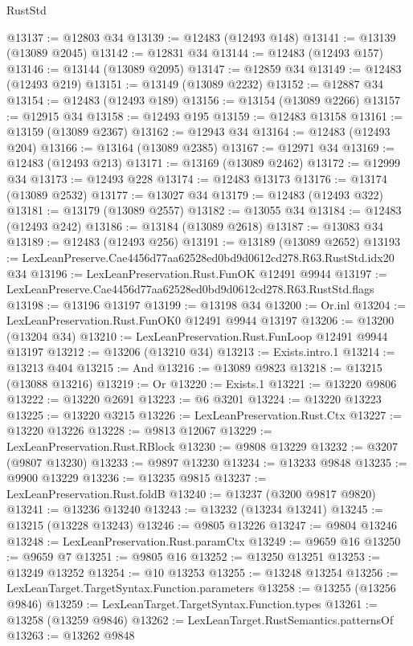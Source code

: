 \begin{lexlean}{RustStd}
\begin{coremodule}
@13137 := @12803 @34
@13139 := @12483 (@12493 @148)
@13141 := @13139 (@13089 @2045)
@13142 := @12831 @34
@13144 := @12483 (@12493 @157)
@13146 := @13144 (@13089 @2095)
@13147 := @12859 @34
@13149 := @12483 (@12493 @219)
@13151 := @13149 (@13089 @2232)
@13152 := @12887 @34
@13154 := @12483 (@12493 @189)
@13156 := @13154 (@13089 @2266)
@13157 := @12915 @34
@13158 := @12493 @195
@13159 := @12483 @13158
@13161 := @13159 (@13089 @2367)
@13162 := @12943 @34
@13164 := @12483 (@12493 @204)
@13166 := @13164 (@13089 @2385)
@13167 := @12971 @34
@13169 := @12483 (@12493 @213)
@13171 := @13169 (@13089 @2462)
@13172 := @12999 @34
@13173 := @12493 @228
@13174 := @12483 @13173
@13176 := @13174 (@13089 @2532)
@13177 := @13027 @34
@13179 := @12483 (@12493 @322)
@13181 := @13179 (@13089 @2557)
@13182 := @13055 @34
@13184 := @12483 (@12493 @242)
@13186 := @13184 (@13089 @2618)
@13187 := @13083 @34
@13189 := @12483 (@12493 @256)
@13191 := @13189 (@13089 @2652)
@13193 := LexLeanPreserve.Cae4456d77aa62528ed0bd9d0612cd278.R63.RustStd.idx20 @34
@13196 := LexLeanPreservation.Rust.FunOK @12491 @9944
@13197 := LexLeanPreserve.Cae4456d77aa62528ed0bd9d0612cd278.R63.RustStd.flags
@13198 := @13196 @13197
@13199 := @13198 @34
@13200 := Or.inl
@13204 := LexLeanPreservation.Rust.FunOK0 @12491 @9944 @13197
@13206 := @13200 (@13204 @34)
@13210 := LexLeanPreservation.Rust.FunLoop @12491 @9944 @13197
@13212 := @13206 (@13210 @34)
@13213 := Exists.intro.{1}
@13214 := @13213 @404
@13215 := And
@13216 := @13089 @9823
@13218 := @13215 (@13088 @13216)
@13219 := Or
@13220 := Exists.{1}
@13221 := @13220 @9806
@13222 := @13220 @2691
@13223 := @6 @3201
@13224 := @13220 @13223
@13225 := @13220 @3215
@13226 := LexLeanPreservation.Rust.Ctx
@13227 := @13220 @13226
@13228 := @9813 @12067
@13229 := LexLeanPreservation.Rust.RBlock
@13230 := @9808 @13229
@13232 := @3207 (@9807 @13230)
@13233 := @9897 @13230
@13234 := @13233 @9848
@13235 := @9900 @13229
@13236 := @13235 @9815
@13237 := LexLeanPreservation.Rust.foldB
@13240 := @13237 (@3200 @9817 @9820)
@13241 := @13236 @13240
@13243 := @13232 (@13234 @13241)
@13245 := @13215 (@13228 @13243)
@13246 := @9805 @13226
@13247 := @9804 @13246
@13248 := LexLeanPreservation.Rust.paramCtx
@13249 := @9659 @16
@13250 := @9659 @7
@13251 := @9805 @16
@13252 := @13250 @13251
@13253 := @13249 @13252
@13254 := @10 @13253
@13255 := @13248 @13254
@13256 := LexLeanTarget.TargetSyntax.Function.parameters
@13258 := @13255 (@13256 @9846)
@13259 := LexLeanTarget.TargetSyntax.Function.types
@13261 := @13258 (@13259 @9846)
@13262 := LexLeanTarget.RustSemantics.patternsOf
@13263 := @13262 @9848

\end{coremodule}
\end{lexlean}
